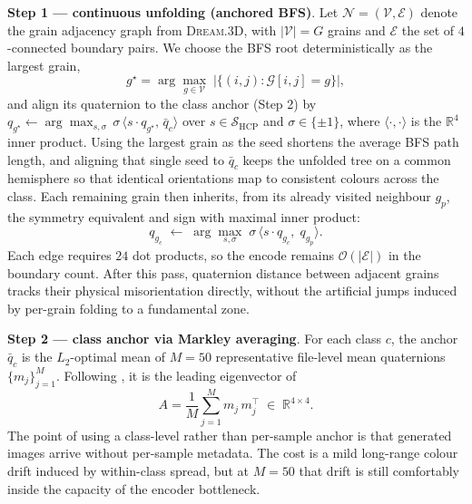 \documentclass{article}
\newcommand{\dreamthreed}{\textsc{Dream.3D}}
\newcommand{\R}{\mathbb{R}}
\begin{document}
\textbf{Step 1 --- continuous unfolding (anchored BFS)}. Let $\mathcal{N}=(\mathcal{V},\mathcal{E})$ denote the grain adjacency graph from \dreamthreed{}, with $|\mathcal{V}|=G$ grains and $\mathcal{E}$ the set of $4$-connected boundary pairs. We choose the BFS root deterministically as the largest grain,
\begin{equation}
  g^\star = \arg\max_{g \in \mathcal{V}}\; \bigl|\{(i,j) : \mathcal{G}[i,j] = g\}\bigr|,
  \label{eq:bfs-root}
\end{equation}
and align its quaternion to the class anchor (Step 2) by $q_{g^\star} \leftarrow \arg\max_{s,\sigma}\, \sigma\,\langle s\cdot q_{g^\star},\, \bar{q}_c\rangle$ over $s\in\mathcal{S}_{\mathrm{HCP}}$ and $\sigma\in\{\pm 1\}$, where $\langle\cdot,\cdot\rangle$ is the $\R^4$ inner product. Using the largest grain as the seed shortens the average BFS path length, and aligning that single seed to $\bar q_c$ keeps the unfolded tree on a common hemisphere so that identical orientations map to consistent colours across the class. Each remaining grain then inherits, from its already visited neighbour $g_p$, the symmetry equivalent and sign with maximal inner product:
\begin{equation}
  q_{g_c} \;\leftarrow\; \arg\max_{s,\sigma}\; \sigma\, \langle s \cdot q_{g_c},\; q_{g_p} \rangle.
  \label{eq:bfs-step}
\end{equation}
Each edge requires $24$ dot products, so the encode remains $\mathcal{O}(|\mathcal{E}|)$ in the boundary count. After this pass, quaternion distance between adjacent grains tracks their physical misorientation directly, without the artificial jumps induced by per-grain folding to a fundamental zone.

\textbf{Step 2 --- class anchor via Markley averaging}. For each class $c$, the anchor $\bar q_c$ is the $L_2$-optimal mean of $M{=}50$ representative file-level mean quaternions $\{m_j\}_{j=1}^M$. Following \citet{markley2007}, it is the leading eigenvector of
\begin{equation}
  A = \frac{1}{M}\sum_{j=1}^{M} m_j\, m_j^{\top} \;\in\; \R^{4\times 4}.
  \label{eq:markley}
\end{equation}
The point of using a class-level rather than per-sample anchor is that generated images arrive without per-sample metadata. The cost is a mild long-range colour drift induced by within-class spread, but at $M{=}50$ that drift is still comfortably inside the capacity of the encoder bottleneck.
\end{document}
